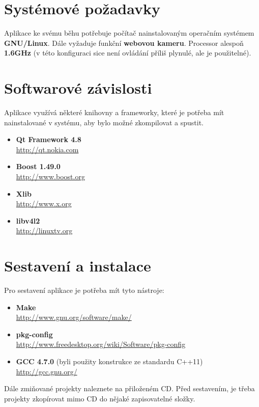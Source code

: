 \newpage

\section{Systémové požadavky}
Aplikace ke svému běhu potřebuje počítač nainstalovaným operačním systémem
\textbf{GNU/Linux}. Dále vyžaduje funkční \textbf{webovou kameru}. Processor
alespoň \textbf{1.6GHz} (v této konfiguraci sice není ovládání příliš plynulé,
ale je použitelné).

\section{Softwarové závislosti}
Aplikace využívá některé knihovny a frameworky, které je potřeba mít
nainstalované v systému, aby bylo možné zkompilovat a spustit.

\begin{itemize}
    \item \textbf{Qt Framework 4.8}\\
    \url{http://qt.nokia.com}
    \item \textbf{Boost 1.49.0}\\
    \url{http://www.boost.org}
    \item \textbf{Xlib} \\
    \url{http://www.x.org}
    \item \textbf{libv4l2} \\
    \url{http://linuxtv.org}
\end{itemize}

\section{Sestavení a instalace}
Pro sestavení aplikace je potřeba mít tyto nástroje:

\begin{itemize}
    \item \textbf{Make} \\
    \url{http://www.gnu.org/software/make/}
    \item \textbf{pkg-config} \\
    \url{http://www.freedesktop.org/wiki/Software/pkg-config}
    \item \textbf{GCC 4.7.0} (byli použity konstrukce ze standardu C++11) \\
    \url{http://gcc.gnu.org/}
\end{itemize}

\bigskip\noindent
Dále zmiňované projekty naleznete na přiloženém CD. Před sestavením, je třeba
projekty zkopírovat mimo CD do nějaké zapisovatelné složky.

